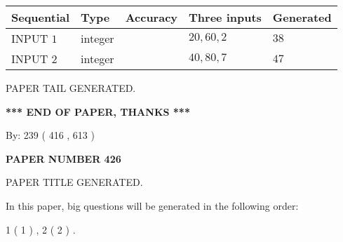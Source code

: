 \documentclass{ctexart}
\begin{document}
   
  
  
\noindent\begin{tabular}{|l|l|l|l|l|}
\hline
 Sequential & Type & Accuracy & Three inputs & Generated \\ 
\hline
 
 
  INPUT $  1 $ & integer &  & $
 20
 , 
 60
 , 
 2
 $ & $ 38 $ 
 \\  \hline  
 
 
  INPUT $  2 $ & integer &  & $
 40
 , 
 80
 , 
 7
 $ & $ 47 $ 
 \\  \hline  
 \end{tabular}
   
   
   
   
   
   
 \vspace{0.2in}
 
   
   
\vspace{2.0in} PAPER TAIL GENERATED.
   
   
   
   
\vspace{1.0in} 
{\textbf{\large{ *** END OF PAPER, THANKS *** }}} 
   
   
\hspace{1.0in} By: 
 239 ( 416 ,  613 )
   
   
   
   
\newpage 
\setcounter{page}{ 
   426001 } 
   
   
   
   
 {\textbf{ \Large{ PAPER NUMBER  426  }}}
   
   
\vspace{0.2in}
   
   
   
   
   
   
   
   
 \vspace{0.2in}
 
 
 
 
   
   
 PAPER TITLE GENERATED.
   
   
   
\vspace{0.2in}
   
In this paper, big questions will be generated in the following order: 
   
   
   1 ( 1 )
 ,
   2 ( 2 )
 .
  
\end{document}
